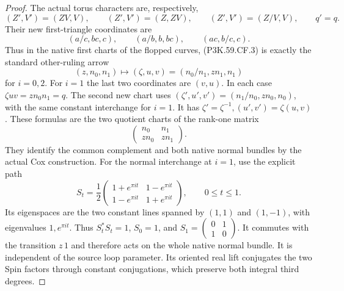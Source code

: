 \begin{proof}
The actual torus characters are, respectively,
\[
 (Z',V')=(ZV,V),\qquad (Z',V')=(Z,ZV),\qquad
 (Z',V')=(Z/V,V),\qquad q'=q.                         \tag{P3K.59.CF.3}
\]
Their new first-triangle coordinates are
\[
 (a/c,bc,c),\qquad (a/b,b,bc),\qquad (ac,b/c,c).        \tag{P3K.59.CF.4}
\]
Thus in the native first charts of the flopped curves, (P3K.59.CF.3)
is exactly the standard other-ruling arrow
\[
 (z,n_0,n_1)\longmapsto
  (\zeta,u,v)=(n_0/n_1,zn_1,n_1)                     \tag{P3K.59.CF.5}
\]
for \(i=0,2\). For \(i=1\) the last two coordinates are
\((v,u)\). In each case \(\zeta uv=zn_0n_1=q\).
The second new chart uses
\((\zeta',u',v')=(n_1/n_0,zn_0,n_0)\), with the same
constant interchange for \(i=1\). It has
\(\zeta'=\zeta^{-1},(u',v')=\zeta(u,v)\).
These formulas are the two quotient charts of the rank-one matrix
\[
 \begin{pmatrix}n_0&n_1\\zn_0&zn_1\end{pmatrix}.       \tag{P3K.59.CF.6}
\]
They identify the common complement and both native normal bundles
by the actual Cox construction. For the normal interchange at
\(i=1\), use the explicit path
\[
 S_t=\frac12
 \begin{pmatrix}
 1+e^{\pi it}&1-e^{\pi it}\\
 1-e^{\pi it}&1+e^{\pi it}
 \end{pmatrix},\qquad 0\le t\le1.                    \tag{P3K.59.CF.6a}
\]
Its eigenspaces are the two constant lines spanned by
\((1,1)\) and \((1,-1)\), with eigenvalues \(1,e^{\pi it}\).
Thus \(S_t^*S_t=1\), \(S_0=1\), and
\(S_1=(\begin{smallmatrix}0&1\\1&0\end{smallmatrix})\).
It commutes with the transition \(z\,1\) and therefore acts on
the whole native normal bundle. It is independent of the source
loop parameter. Its oriented real lift conjugates the two
Spin factors through constant conjugations, which preserve
both integral third degrees.


\end{proof}
